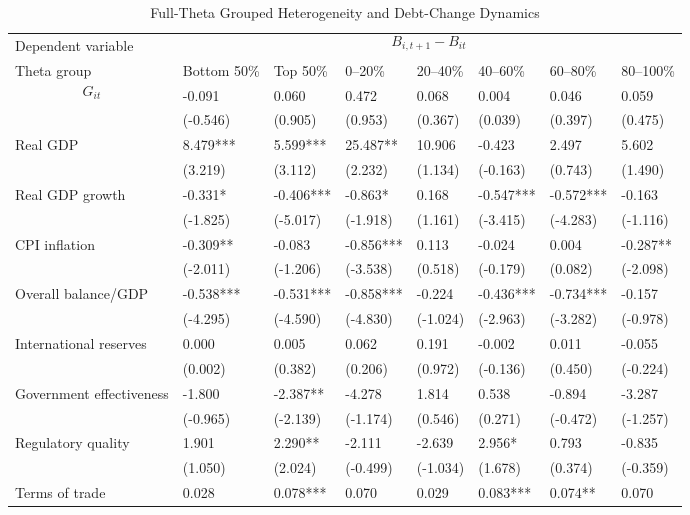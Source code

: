 \begin{table}[H]\centering
\begin{threeparttable}
\caption{Full-Theta Grouped Heterogeneity and Debt-Change Dynamics}
\label{tab:theta_group_heterogeneity_debt}
\scriptsize
\begin{tabularx}{\textwidth}{lYYYYYYY}
\toprule
Dependent variable &  \\
\cmidrule(lr){2-8}
Theta group & Bottom 50\% & Top 50\% & 0--20\% & 20--40\% & 40--60\% & 60--80\% & 80--100\% \\
\midrule
$$G_{it}$$ & -0.091 & 0.060 & 0.472 & 0.068 & 0.004 & 0.046 & 0.059 \\
  & (-0.546) & (0.905) & (0.953) & (0.367) & (0.039) & (0.397) & (0.475) \\
Real GDP & 8.479*** & 5.599*** & 25.487** & 10.906 & -0.423 & 2.497 & 5.602 \\
  & (3.219) & (3.112) & (2.232) & (1.134) & (-0.163) & (0.743) & (1.490) \\
Real GDP growth & -0.331* & -0.406*** & -0.863* & 0.168 & -0.547*** & -0.572*** & -0.163 \\
  & (-1.825) & (-5.017) & (-1.918) & (1.161) & (-3.415) & (-4.283) & (-1.116) \\
CPI inflation & -0.309** & -0.083 & -0.856*** & 0.113 & -0.024 & 0.004 & -0.287** \\
  & (-2.011) & (-1.206) & (-3.538) & (0.518) & (-0.179) & (0.082) & (-2.098) \\
Overall balance/GDP & -0.538*** & -0.531*** & -0.858*** & -0.224 & -0.436*** & -0.734*** & -0.157 \\
  & (-4.295) & (-4.590) & (-4.830) & (-1.024) & (-2.963) & (-3.282) & (-0.978) \\
International reserves & 0.000 & 0.005 & 0.062 & 0.191 & -0.002 & 0.011 & -0.055 \\
  & (0.002) & (0.382) & (0.206) & (0.972) & (-0.136) & (0.450) & (-0.224) \\
Government effectiveness & -1.800 & -2.387** & -4.278 & 1.814 & 0.538 & -0.894 & -3.287 \\
  & (-0.965) & (-2.139) & (-1.174) & (0.546) & (0.271) & (-0.472) & (-1.257) \\
Regulatory quality & 1.901 & 2.290** & -2.111 & -2.639 & 2.956* & 0.793 & -0.835 \\
  & (1.050) & (2.024) & (-0.499) & (-1.034) & (1.678) & (0.374) & (-0.359) \\
Terms of trade & 0.028 & 0.078*** & 0.070 & 0.029 & 0.083*** & 0.074** & 0.070 \\

\end{tabularx}
\end{threeparttable}
\end{table}
